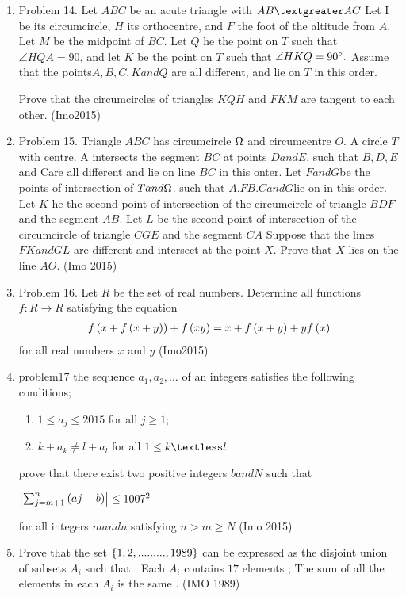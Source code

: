 \begin{enumerate}
\item Problem 14. Let $ABC$ be an acute triangle with $AB\textgreater AC$ Let I be its circumcircle, $H$ its orthocentre, and $F$ the foot of the altitude from $A$. Let $M$ be the midpoint of $BC$. Let $Q$ he the point on $T$ such that $\angle HQA= 90$, and let $K$ be the point on $T$ such that $\angle HKQ=90\degree.$ Assume that the points$ A, B, C, K and Q$ are all different, and lie on $T$ in this order.

	Prove that the circumcircles of triangles $KQH$ and $FKM$ are tangent to each other. \hfill(Imo2015)
\item Problem 15. Triangle $ABC$ has circumcircle $\ohm$ and circumcentre $O$. A circle $T$ with centre. A intersects the segment $BC$ at points $D and E$, such that $B, D, E $and Care all different and lie on line $BC$ in this onter. Let $F and G $be the points of intersection of $T and \ohm$. such that $A. F B. C and G $lie on \ohm in this order. Let $K $ he the second point of intersection of the circumcircle of triangle $BDF$ and the segment $AB$. Let $L$ be the second point of intersection of the circumcircle of triangle $CGE$ and the segment $CA$
	Suppose that the lines $FKand GL$ are different and intersect at the point $X$. Prove that $X$ lies on the line $AO$. \hfill(Imo 2015)
\item Problem 16. Let $R$ be the set of real numbers. Determine all functions $f:R\rightarrow R$ satisfying the equation
	\begin{align}
		f\left(x+f\left(x+y\right)\right)+f\left(xy\right)=x+f\left(x+y\right)+yf\left(x\right)
	\end{align}
for all real numbers $x$ and $y$ \hfill(Imo2015)

\item problem17 the sequence $a_1,a_2, \ldots$ of an integers satisfies the following conditions;
	\begin{enumerate}
		\item $1\leq a_{j} \leq2015$ for all $j\geq 1;$
		\item $k+a_{k} \neq l+a_{l}$ for all $1\leq k \textless l.$
	\end{enumerate}	
prove that there exist two positive integers $b and N$ such that

$\begin{vmatrix}\sum_{j=m+1}^{n} \left(aj-b\right) \end{vmatrix}\leq 1007^2$

for all integers $m and n$ satisfying $n > m\geq N$ \hfill(Imo 2015)
\item Prove that the set $\left\{1,2,.........,1989\right\}$ can be expressed as the disjoint union of subsets $A_i$ such that :
 Each $A_i$ contains $17$ elements ;
		 The sum of all the elements in each $A_i$ is the same . \hfill(IMO 1989)



\end{enumerate}
